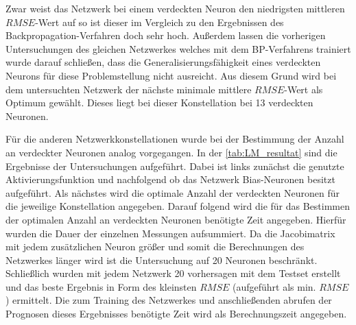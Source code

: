 \begin{figure}[!htb]
    \centering
        
    \caption{}
    \label{fig:LM_tanh_m-hneuron}
\end{figure}

Zwar weist das Netzwerk bei einem verdeckten Neuron den niedrigsten mittleren $RMSE$-Wert auf so ist dieser im Vergleich zu den Ergebnissen des Backpropagation-Verfahren doch sehr hoch. Außerdem lassen die vorherigen Untersuchungen des gleichen Netzwerkes welches mit dem BP-Verfahrens trainiert wurde darauf schließen, dass die Generalisierungsfähigkeit eines verdeckten Neurons für diese Problemstellung nicht ausreicht. Aus diesem Grund wird bei dem untersuchten Netzwerk der nächste minimale mittlere $RMSE$-Wert als Optimum gewählt. Dieses liegt bei dieser Konstellation bei 13 verdeckten Neuronen. 

Für die anderen Netzwerkkonstellationen wurde bei der Bestimmung der Anzahl an verdeckter Neuronen analog vorgegangen. In der \autoref{tab:LM_resultat} sind die Ergebnisse der Untersuchungen aufgeführt. Dabei ist links zunächst die genutzte Aktivierungsfunktion und nachfolgend ob das Netzwerk Bias-Neuronen besitzt aufgeführt. Als nächstes wird die optimale Anzahl der verdeckten Neuronen für die jeweilige Konstellation angegeben. Darauf folgend wird die für das Bestimmen der optimalen Anzahl an verdeckten Neuronen benötigte Zeit angegeben. Hierfür wurden die Dauer der einzelnen Messungen aufsummiert. Da die Jacobimatrix mit jedem zusätzlichen Neuron größer und somit die Berechnungen des Netzwerkes länger wird ist die Untersuchung auf 20 Neuronen beschränkt. Schließlich wurden mit jedem Netzwerk 20 vorhersagen mit dem Testset erstellt und das beste Ergebnis in Form des kleinsten $RMSE$ (aufgeführt als min. $RMSE$) ermittelt. Die zum Training des Netzwerkes und anschließenden abrufen der Prognosen dieses Ergebnisses benötigte Zeit wird als Berechnungszeit angegeben.

